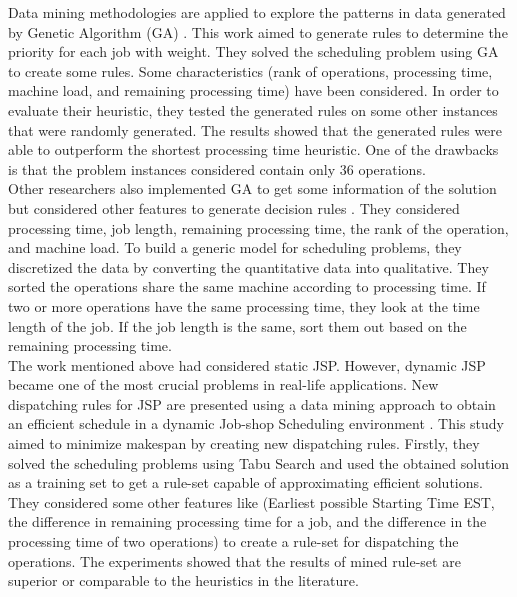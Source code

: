 \documentclass[runningheads]{llncs}
\begin{document}
Data mining methodologies are applied to explore the patterns in data generated by Genetic Algorithm (GA) \cite{koonce2000using}. This work aimed to generate rules to determine the priority for each job with weight. They solved the scheduling problem using GA to create some rules. Some characteristics (rank of operations, processing time, machine load, and remaining processing time) have been considered. In order to evaluate their heuristic, they tested the generated rules on some other instances that were randomly generated. The results showed that the generated rules were able to outperform the shortest processing time heuristic. One of the drawbacks is that the problem instances considered contain only 36 operations.\\

Other researchers also implemented GA to get some information of the solution but considered other features to generate decision rules \cite{harrath2002genetic}. They considered processing time, job length, remaining processing time, the rank of the operation, and machine load. To build a generic model for scheduling problems, they discretized the data by converting the quantitative data into qualitative. They sorted the operations share the same machine according to processing time. If two or more operations have the same processing time, they look at the time length of the job. If the job length is the same, sort them out based on the remaining processing time.\\

The work mentioned above had considered static JSP. However, dynamic JSP became one of the most crucial problems in real-life applications. New dispatching rules for JSP are presented using a data mining approach to obtain an efficient schedule in a dynamic Job-shop Scheduling environment \cite{shahzad2010discovering}. This study aimed to minimize makespan by creating new dispatching rules. Firstly, they solved the scheduling problems using Tabu Search and used the obtained solution as a training set to get a rule-set capable of approximating efficient solutions. They considered some other features like (Earliest possible Starting Time EST, the difference in remaining processing time for a job, and the difference in the processing time of two operations) to create a rule-set for dispatching the operations. The experiments showed that the results of mined rule-set are superior or comparable to the heuristics in the literature.\\
\end{document}
